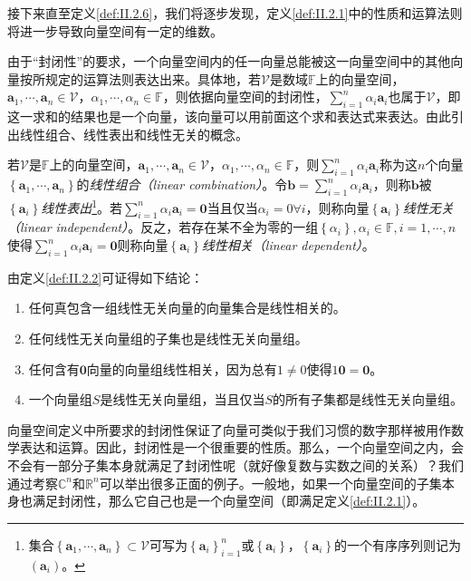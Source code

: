 \documentclass[../main.tex]{subfiles}
\begin{document}
接下来直至定义\ref{def:II.2.6}，我们将逐步发现，定义\ref{def:II.2.1}中的性质和运算法则将进一步导致向量空间有一定的维数。

由于“封闭性”的要求，一个向量空间内的任一向量总能被这一向量空间中的其他向量按所规定的运算法则表达出来。具体地，若$\mathcal{V}$是数域$\mathbb{F}$上的向量空间，$\mathbf{a}_1,\cdots,\mathbf{a}_n\in\mathcal{V}$，$\alpha_1,\cdots,\alpha_n\in\mathbb{F}$，则依据向量空间的封闭性，$\sum_{i=1}^n\alpha_i\mathbf{a}_i$也属于$\mathcal{V}$，即这一求和的结果也是一个向量，该向量可以用前面这个求和表达式来表达。由此引出线性组合、线性表出和线性无关的概念。

\begin{definition}\label{def:II.2.2}\cite[\S 7.2定义2.2、2.3]{周胜林2012线性代数}
    若$\mathcal{V}$是$\mathbb{F}$上的向量空间，$\mathbf{a}_1,\cdots,\mathbf{a}_n\in\mathcal{V}$，$\alpha_1,\cdots,\alpha_n\in\mathbb{F}$，则$\sum_{i=1}^n\alpha_i\mathbf{a}_i$称为这$n$个向量$\left\{\mathbf{a}_1,\cdots,\mathbf{a}_n\right\}$的\emph{线性组合（linear combination）}。令$\mathbf{b}=\sum_{i=1}^n\alpha_i\mathbf{a}_i$，则称$\mathbf{b}$被$\left\{\mathbf{a}_i\right\}$\emph{线性表出}\footnote{集合$\left\{\mathbf{a}_1,\cdots,\mathbf{a}_n\right\}\subset\mathcal{V}$可写为$\left\{\mathbf{a}_i\right\}_{i=1}^n$或$\left\{\mathbf{a}_i\right\}$，$\left\{\mathbf{a}_i\right\}$的一个有序序列则记为$\left(\mathbf{a}_i\right)$。}。若$\sum_{i=1}^n\alpha_i\mathbf{a}_i=\bm{0}$当且仅当$\alpha_i=0\forall i$，则称向量$\left\{\mathbf{a}_i\right\}$\emph{线性无关（linear independent）}。反之，若存在某不全为零的一组$\left\{\alpha_i\right\},\alpha_i\in\mathbb{F},i=1,\cdots,n$使得$\sum_{i=1}^n\alpha_i\mathbf{a}_i=\bm{0}$则称向量$\left\{\mathbf{a}_i\right\}$\emph{线性相关（linear dependent）}。
\end{definition}

由定义\ref{def:II.2.2}可证得如下结论\cite[\S 7.2定义2.3下的“常用结果”]{周胜林2012线性代数}：
\begin{enumerate}
    \item 任何真包含一组线性无关向量的向量集合是线性相关的。
    \item 任何线性无关向量组的子集也是线性无关向量组。
    \item 任何含有$\mathbf{0}$向量的向量组线性相关，因为总有$1\neq 0$使得$1\mathbf{0}=\mathbf{0}$。
    \item 一个向量组$S$是线性无关向量组，当且仅当$S$的所有子集都是线性无关向量组。
\end{enumerate}

向量空间定义中所要求的封闭性保证了向量可类似于我们习惯的数字那样被用作数学表达和运算。因此，封闭性是一个很重要的性质。那么，一个向量空间之内，会不会有一部分子集本身就满足了封闭性呢（就好像复数与实数之间的关系）？我们通过考察$\mathbb{C}^n$和$\mathbb{R}^n$可以举出很多正面的例子。一般地，如果一个向量空间的子集本身也满足封闭性，那么它自己也是一个向量空间（即满足定义\ref{def:II.2.1}）。
\end{document}
